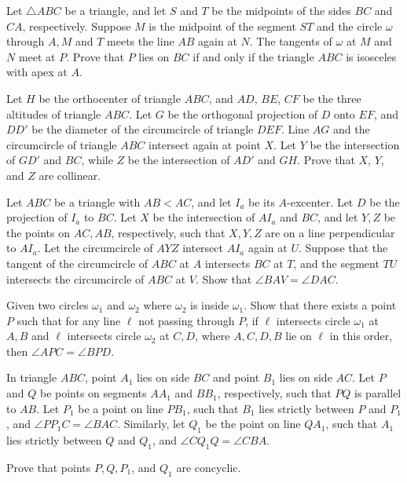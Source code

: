 \documentclass[11pt]{scrartcl}
\begin{document}
\begin{problem}[8639636622304457736]
Let $\triangle ABC$ be a triangle, and let $S$ and $T$ be the midpoints of the sides $BC$ and $CA$, respectively. Suppose $M$ is the midpoint of the segment $ST$ and the circle $\omega$ through $A, M$ and $T$ meets the line $AB$ again at $N$. The tangents of $\omega$ at $M$ and $N$ meet at $P$. Prove that $P$ lies on $BC$ if and only if the triangle $ABC$ is isosceles with apex at $A$.
\end{problem}
\begin{problem}[1872712387771032593]
Let $H$ be the orthocenter of triangle $ABC$, and $AD$, $BE$, $CF$ be the three altitudes of triangle $ABC$. Let $G$ be the orthogonal projection of $D$ onto $EF$, and $DD'$ be the diameter of the circumcircle of triangle $DEF$. Line $AG$ and the circumcircle of triangle $ABC$ intersect again at point $X$. Let $Y$ be the intersection of $GD'$ and $BC$, while $Z$ be the intersection of $AD'$ and $GH$. Prove that $X$, $Y$, and $Z$ are collinear.
\end{problem}
\begin{problem}[7017112574129036660]
	Let $ABC$ be a triangle with $AB<AC$, and let $I_a$ be its $A$-excenter. Let $D$ be the projection of $I_a$ to $BC$. Let $X$ be the intersection of $AI_a$ and $BC$, and let $Y,Z$ be the points on $AC,AB$, respectively, such that $X,Y,Z$ are on a line perpendicular to $AI_a$. Let the circumcircle of $AYZ$ intersect $AI_a$ again at $U$. Suppose that the tangent of the circumcircle of $ABC$ at $A$ intersects $BC$ at $T$, and the segment $TU$ intersects the circumcircle of $ABC$ at $V$. Show that $\angle BAV=\angle DAC$.
\end{problem}
\begin{problem}[7268978143074030034]
Given two circles $\omega_1$ and $\omega_2$ where $\omega_2$ is inside $\omega_1$. Show that there exists a point $P$ such that for any line $\ell$ not passing through $P$, if $\ell$ intersects circle $\omega_1$ at $A,B$ and $\ell$ intersects circle $\omega_2$ at $C,D$, where $A,C,D,B$ lie on $\ell$ in this order, then $\angle APC=\angle BPD$.
\end{problem}
\begin{problem}[684771433215596]
In triangle $ABC$, point $A_1$ lies on side $BC$ and point $B_1$ lies on side $AC$. Let $P$ and $Q$ be points on segments $AA_1$ and $BB_1$, respectively, such that $PQ$ is parallel to $AB$. Let $P_1$ be a point on line $PB_1$, such that $B_1$ lies strictly between $P$ and $P_1$, and $\angle PP_1C=\angle BAC$. Similarly, let $Q_1$ be the point on line $QA_1$, such that $A_1$ lies strictly between $Q$ and $Q_1$, and $\angle CQ_1Q=\angle CBA$.

Prove that points $P,Q,P_1$, and $Q_1$ are concyclic.
\end{problem}
\end{document}
